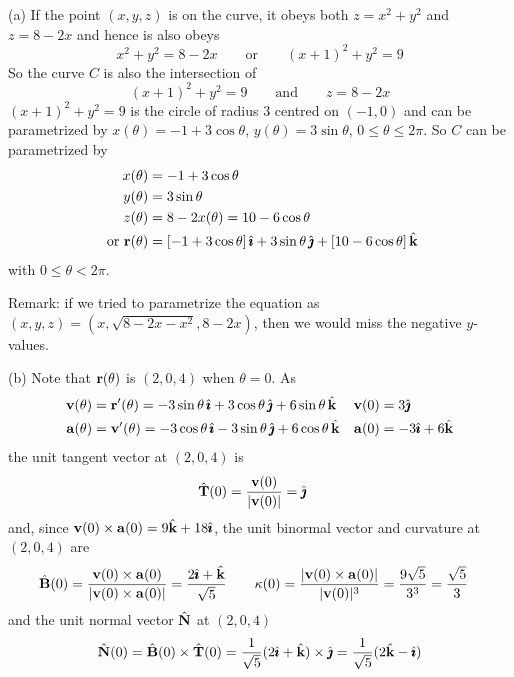 \begin{solution} (a)
If the point $(x,y,z)$ is on the curve, it obeys both 
$z = x^2 + y^2$ and $z = 8-2x$ and hence is also obeys
\begin{equation*}
x^2+y^2 = 8-2x\qquad\text{or}\qquad
   (x+1)^2+y^2 =9
\end{equation*}
So the curve $C$ is also the intersection of
\begin{equation*}
(x+1)^2+y^2 =9\qquad\text{and}\qquad  z = 8-2x
\end{equation*}
$(x+1)^2+y^2 =9$ is the circle of radius $3$ centred on $(-1,0)$ and can
be parametrized by
$x(\theta) = -1 + 3\cos\theta$, $y(\theta) = 3\sin\theta$, $0\le\theta\le 2\pi$.
So $C$ can be parametrized by
\begin{align*}
x(\theta) &= -1 + 3\cos\theta \\
y(\theta) &= 3\sin\theta \\
z(\theta) &= 8-2x(\theta) = 10-6\cos\theta \\
\text{ or }\mathbf{r}(\theta) &= [-1 + 3\cos\theta]\,\hat{\pmb{\imath}}
                   +3\sin\theta\,\hat{\pmb{\jmath}}
                   +[10-6\cos\theta]\,\hat{\mathbf{k}}
\end{align*}
with $0\le\theta < 2\pi$.

Remark: if we tried to parametrize the equation as $(x,y,z)=(x,\sqrt{8-2x-x^2},8-2x)$, then we would miss the negative $y$-values.

\noindent (b)
Note that $\mathbf{r}(\theta)$ is $(2,0,4)$ when $\theta=0$.
As
\begin{align*}
\mathbf{v}(\theta)&=\mathbf{r}'(\theta) = -3\sin\theta\,\hat{\pmb{\imath}}
                   +3\cos\theta\,\hat{\pmb{\jmath}}
                   +6\sin\theta\,\hat{\mathbf{k}} &
\mathbf{v}(0)&=3\hat{\pmb{\jmath}} \\
\mathbf{a}(\theta)&=\mathbf{v}'(\theta) = -3\cos\theta\,\hat{\pmb{\imath}}
                   -3\sin\theta\,\hat{\pmb{\jmath}}
                   +6\cos\theta\,\hat{\mathbf{k}} &
\mathbf{a}(0)&= -3\hat{\pmb{\imath}}+6\hat{\mathbf{k}}
\end{align*}
the unit tangent vector at $(2,0,4)$ is
\begin{align*}
\hat{\mathbf{T}}(0) &= \frac{\mathbf{v}(0)}{|\mathbf{v}(0)|} =\hat{\pmb{\jmath}}
\end{align*}
and, since $\mathbf{v}(0)\times\mathbf{a}(0) = 9\hat{\mathbf{k}}+18\hat{\pmb{\imath}}$, the unit binormal vector and 
curvature at $(2,0,4)$ are
\begin{align*}
\hat{\mathbf{B}}(0) &= \frac{\mathbf{v}(0)\times\mathbf{a}(0)}{|\mathbf{v}(0)\times\mathbf{a}(0)|} 
=\frac{2\hat{\pmb{\imath}}+\hat{\mathbf{k}}}{\sqrt{5}}\qquad
\kappa(0) = \frac{|\mathbf{v}(0)\times\mathbf{a}(0)|}{|\mathbf{v}(0)|^3}
=\frac{9\sqrt{5}}{3^3}=\frac{\sqrt{5}}{3}
\end{align*}
and the unit normal vector $\hat{\mathbf{N}}$ at $(2,0,4)$
\begin{align*}
\hat{\mathbf{N}}(0) = \hat{\mathbf{B}}(0) \times \hat{\mathbf{T}}(0)
           =\frac{1}{\sqrt{5}} (2\hat{\pmb{\imath}}+\hat{\mathbf{k}})\times\hat{\pmb{\jmath}}
           =\frac{1}{\sqrt{5}} (2\hat{\mathbf{k}}-\hat{\pmb{\imath}})
\end{align*}


\end{solution}



